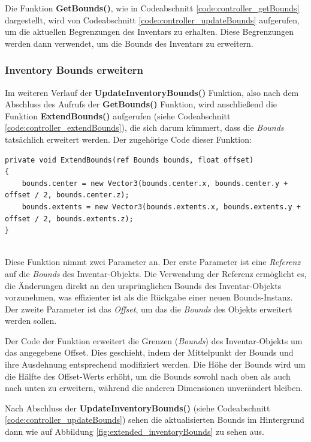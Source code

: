 Die Funktion \textbf{GetBounds()}, wie in Codeabschnitt \ref{code:controller_getBounds} dargestellt, wird von Codeabschnitt
\ref{code:controller_updateBounds} aufgerufen, um die aktuellen Begrenzungen des Inventars zu erhalten. Diese Begrenzungen
werden dann verwendet, um die Bounds des Inventars zu erweitern.

\subsubsection{Inventory Bounds erweitern}
Im weiteren Verlauf der \textbf{UpdateInventoryBounds()} Funktion, also nach dem Abschluss des Aufrufs der \textbf{GetBounds()}
Funktion, wird anschließend die Funktion \textbf{ExtendBounds()} aufgerufen (siehe Codeabschnitt \ref{code:controller_extendBounds}),
die sich darum kümmert, dass die \textit{Bounds} tatsächlich erweitert werden. Der zugehörige Code dieser Funktion:
\begin{lstlisting}[style=csharp, caption={Funktion um Bounds zu erweitern}, label=code:controller_extendBounds]
private void ExtendBounds(ref Bounds bounds, float offset)
{
    bounds.center = new Vector3(bounds.center.x, bounds.center.y + offset / 2, bounds.center.z);
    bounds.extents = new Vector3(bounds.extents.x, bounds.extents.y + offset / 2, bounds.extents.z);
}
\end{lstlisting}\\
Diese Funktion nimmt zwei Parameter an. Der erste Parameter ist eine \textit{Referenz} auf die \textit{Bounds} des
Inventar-Objekts. Die Verwendung der Referenz ermöglicht es, die Änderungen direkt an den ursprünglichen Bounds des
Inventar-Objekts vorzunehmen, was effizienter ist als die Rückgabe einer neuen Bounds-Instanz. Der zweite Parameter ist
das \textit{Offset}, um das die \textit{Bounds} des Objekts erweitert werden sollen.

Der Code der Funktion erweitert die Grenzen (\textit{Bounds}) des Inventar-Objekts um das angegebene Offset. Dies geschieht,
indem der Mittelpunkt der Bounds und ihre Ausdehnung entsprechend modifiziert werden. Die Höhe der Bounds wird um die
Hälfte des Offset-Werts erhöht, um die Bounds sowohl nach oben als auch nach unten zu erweitern, während die anderen
Dimensionen unverändert bleiben.

Nach Abschluss der \textbf{UpdateInventoryBounds()} (siehe Codeabschnitt \ref{code:controller_updateBounds}) sehen die
aktualisierten Bounds im Hintergrund dann wie auf Abbildung \ref{fig:extended_inventoryBounds} zu sehen aus.

